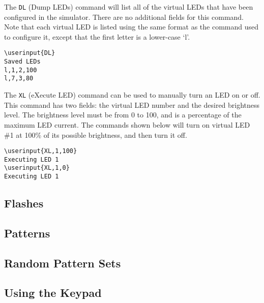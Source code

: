 \documentclass[letterpaper,11pt]{article}
\newcommand\userinput[1]{\textbf{#1}}
\begin{document}
The \texttt{DL} (Dump LEDs) command will list all of the virtual LEDs that
have been configured in the simulator. There are no additional fields for this
command. Note that each virtual LED is listed using the same format as the
command used to configure it, except that the first letter is a lower-case
`l'.
\begin{tcolorbox}
\begin{Verbatim}[commandchars=\\\{\}]
\userinput{DL}
Saved LEDs
l,1,2,100
l,7,3,80
\end{Verbatim}
\end{tcolorbox}

The \texttt{XL} (eXecute LED) command can be used to manually turn an LED on
or off. This command has two fields: the virtual LED number and the desired
brightness level. The brightness level must be from 0 to 100, and is a
percentage of the maximum LED current. The commands shown below will turn
on virtual LED \#1 at 100\% of its possible brightness, and then turn it off.
\begin{tcolorbox}
\begin{Verbatim}[commandchars=\\\{\}]
\userinput{XL,1,100}
Executing LED 1
\userinput{XL,1,0}
Executing LED 1
\end{Verbatim}
\end{tcolorbox}


\subsection*{Flashes}
\subsection*{Patterns}
\subsection*{Random Pattern Sets}
\subsection*{Using the Keypad}
\end{document}
